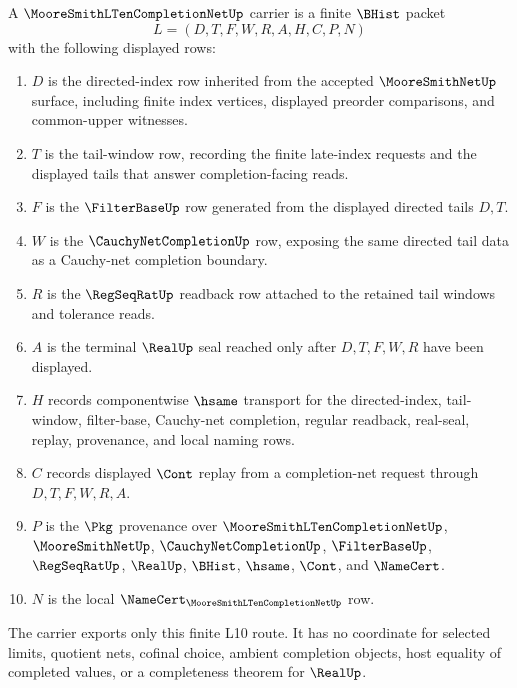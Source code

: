\begin{definition}\label{def:moore-smith-l10-completion-net-carrier}
A $\MooreSmithLTenCompletionNetUp$ carrier is a finite $\BHist$ packet
$$
L=(D,T,F,W,R,A,H,C,P,N)
$$
with the following displayed rows:
\begin{enumerate}
\item $D$ is the directed-index row inherited from the accepted $\MooreSmithNetUp$ surface, including finite index vertices, displayed preorder comparisons, and common-upper witnesses.
\item $T$ is the tail-window row, recording the finite late-index requests and the displayed tails that answer completion-facing reads.
\item $F$ is the $\FilterBaseUp$ row generated from the displayed directed tails $D,T$.
\item $W$ is the $\CauchyNetCompletionUp$ row, exposing the same directed tail data as a Cauchy-net completion boundary.
\item $R$ is the $\RegSeqRatUp$ readback row attached to the retained tail windows and tolerance reads.
\item $A$ is the terminal $\RealUp$ seal reached only after $D,T,F,W,R$ have been displayed.
\item $H$ records componentwise $\hsame$ transport for the directed-index, tail-window, filter-base, Cauchy-net completion, regular readback, real-seal, replay, provenance, and local naming rows.
\item $C$ records displayed $\Cont$ replay from a completion-net request through $D,T,F,W,R,A$.
\item $P$ is the $\Pkg$ provenance over $\MooreSmithLTenCompletionNetUp$, $\MooreSmithNetUp$, $\CauchyNetCompletionUp$, $\FilterBaseUp$, $\RegSeqRatUp$, $\RealUp$, $\BHist$, $\hsame$, $\Cont$, and $\NameCert$.
\item $N$ is the local $\NameCert_{\MooreSmithLTenCompletionNetUp}$ row.
\end{enumerate}
The carrier exports only this finite L10 route. It has no coordinate for selected limits, quotient nets, cofinal choice, ambient completion objects, host equality of completed values, or a completeness theorem for $\RealUp$.
\end{definition}

